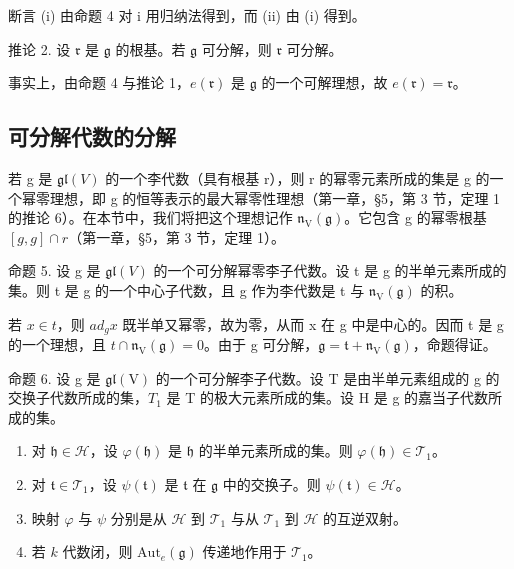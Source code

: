 断言 (i) 由命题 4 对 i 用归纳法得到，而 (ii) 由 (i) 得到。

推论 2. 设 \(\mathfrak{r}\) 是 \(\mathfrak{g}\) 的根基。若 \(\mathfrak{g}\) 可分解，则 \(\mathfrak{r}\) 可分解。

事实上，由命题 4 与推论 1，\(e(\mathfrak{r})\) 是 \(\mathfrak{g}\) 的一个可解理想，故 \(e(\mathfrak{r}) = \mathfrak{r}\)。

\subsection{可分解代数的分解}

若 g 是 \(\mathfrak{gl}(V)\) 的一个李代数（具有根基 r），则 r 的幂零元素所成的集是 g 的一个幂零理想，即 g 的恒等表示的最大幂零性理想（第一章，§5，第 3 节，定理 1 的推论 6）。在本节中，我们将把这个理想记作 \(\mathfrak{n}_{\mathrm{V}}(\mathfrak{g})\)。它包含 g 的幂零根基 \([g,g]\cap r\)（第一章，§5，第 3 节，定理 1）。

命题 5. 设 g 是 \(\mathfrak{gl}(V)\) 的一个可分解幂零李子代数。设 t 是 g 的半单元素所成的集。则 t 是 g 的一个中心子代数，且 g 作为李代数是 t 与 \(\mathfrak{n}_{\mathrm{V}}(\mathfrak{g})\) 的积。

若 \(x \in t\)，则 \(ad_{g}x\) 既半单又幂零，故为零，从而 x 在 g 中是中心的。因而 t 是 g 的一个理想，且 \(t \cap \mathfrak{n}_{\mathrm{V}}(\mathfrak{g}) = 0\)。由于 g 可分解，\(\mathfrak{g} = \mathfrak{t} + \mathfrak{n}_{\mathrm{V}}(\mathfrak{g})\)，命题得证。

命题 6. 设 g 是 \(\mathfrak{gl}(\mathrm{V})\) 的一个可分解李子代数。设 T 是由半单元素组成的 g 的交换子代数所成的集，\(T_{1}\) 是 T 的极大元素所成的集。设 H 是 g 的嘉当子代数所成的集。

\begin{enumerate}
\def\labelenumi{(\roman{enumi})}
\item
  对 \(\mathfrak{h} \in \mathcal{H}\)，设 \(\varphi(\mathfrak{h})\) 是 \(\mathfrak{h}\) 的半单元素所成的集。则 \(\varphi(\mathfrak{h}) \in \mathcal{T}_1\)。
\item
  对 \(\mathfrak{t} \in \mathcal{T}_1\)，设 \(\psi(\mathfrak{t})\) 是 \(\mathfrak{t}\) 在 \(\mathfrak{g}\) 中的交换子。则 \(\psi(\mathfrak{t}) \in \mathscr{H}\)。
\item
  映射 \(\varphi\) 与 \(\psi\) 分别是从 \(\mathcal{H}\) 到 \(\mathcal{T}_1\) 与从 \(\mathcal{T}_1\) 到 \(\mathcal{H}\) 的互逆双射。
\item
  若 \(k\) 代数闭，则 \(\mathrm{Aut}_e(\mathfrak{g})\) 传递地作用于 \(\mathcal{T}_1\)。
\end{enumerate}

